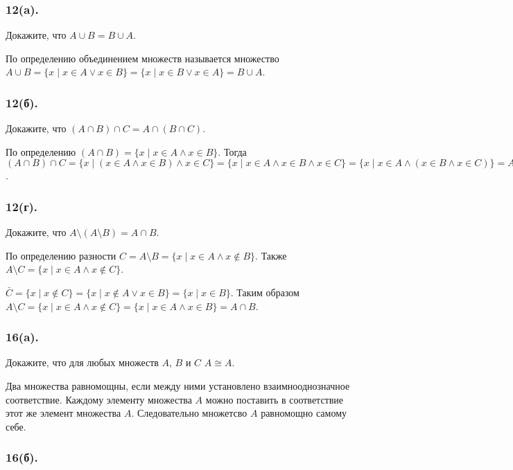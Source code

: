 \documentclass{book}
\begin{document}
\subsubsection{12(a).}

Докажите, что $A \cup B = B \cup A$.

По определению объединением множеств называется множество $ A\cup B=\{x\mid x\in A\vee x\in B\} = \{x\mid x\in B\vee x\in A\} = B\cup A$.

\subsubsection{12(б).}
Докажите, что $(A \cap B) \cap C = A \cap (B \cap C)$.

По определению $(A \cap B) = \{x\mid x\in A\wedge x\in B\}$. Тогда $(A \cap B) \cap C = \{x\mid (x\in A\wedge x\in B)\wedge x\in C\} = \{x\mid x\in A\wedge x\in B\wedge x\in C\} = \{x\mid x\in A\wedge (x\in B\wedge x\in C)\} = A \cap (B \cap C)$.

\subsubsection{12(г).}

Докажите, что $ A \setminus (A \setminus B) = A \cap B$.

По определению разности $C = A\setminus B=\{x\mid x\in A\wedge x\not \in B\}$. Также $A\setminus C = \{x\mid x\in A\wedge x\not \in C\}$.

$\bar{C} = \{x\mid x\not\in C\} = \{x\mid x\not\in A\vee x\in B\} = \{x\mid x\in B\}$.
Таким образом $A\setminus C = \{x\mid x\in A\wedge x\not \in C\} = \{x\mid x\in A\wedge x \in B\} = A \cap B$.

\subsubsection{16(a).}

Докажите, что для любых множеств $A$, $B$ и $C$ $A \cong A$.

Два множества равномощны, если между ними установлено взаимнооднозначное соответствие. Каждому элементу множества $A$ можно поставить в соответствие этот же элемент множества $A$. Следовательно множетсво $A$ равномощно самому себе.

\subsubsection{16(б).}
\end{document}
